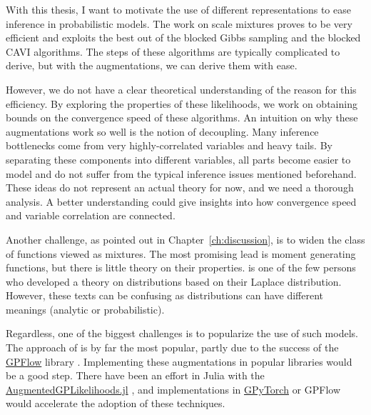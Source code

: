 

\graphicspath{{9_conclusion/figures/}}
With this thesis, I want to motivate the use of different representations to ease inference in probabilistic models.
The work on scale mixtures proves to be very efficient and exploits the best out of the blocked Gibbs sampling and the blocked \ac{CAVI} algorithms.
The steps of these algorithms are typically complicated to derive, but with the augmentations, we can derive them with ease.

However, we do not have a clear theoretical understanding of the reason for this efficiency.
By exploring the properties of these likelihoods, we work on obtaining bounds on the convergence speed of these algorithms.
An intuition on why these augmentations work so well is the notion of decoupling.
Many inference bottlenecks come from very highly-correlated variables and heavy tails.
By separating these components into different variables, all parts become easier to model and do not suffer from the typical inference issues mentioned beforehand.
These ideas do not represent an actual theory for now, and we need a thorough analysis.
A better understanding could give insights into how convergence speed and variable correlation are connected.

Another challenge, as pointed out in Chapter~\ref{ch:discussion}, is to widen the class of functions viewed as mixtures.
The most promising lead is moment generating functions, but there is little theory on their properties.
\citet{schwartz1952transformation} is one of the few persons who developed a theory on distributions based on their Laplace distribution. However, these texts can be confusing as distributions can have different meanings (analytic or probabilistic).

Regardless, one of the biggest challenges is to popularize the use of such models.
The approach of \citet{Hensman2015} is by far the most popular, partly due to the success of the \href{https://github.com/GPflow/GPflow}{GPFlow} library \cite{GPflow2017}.
Implementing these augmentations in popular libraries would be a good step.
There have been an effort in Julia with the \href{https://github.com/JuliaGaussianProcesses/AugmentedGPLikelihoods.jl}{AugmentedGPLikelihoods.jl} \cite{theo_galy_fajou_2022_6347022}, and implementations in \href{https://gpytorch.ai/}{GPyTorch} \cite{gardner2018gpytorch} or GPFlow would accelerate the adoption of these techniques.



